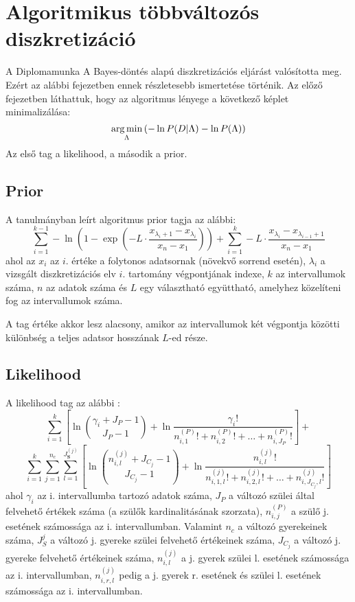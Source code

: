 \chapter{Algoritmikus többváltozós diszkretizáció}
\label{chapter:bayesdontesalapu}
A Diplomamunka A Bayes-döntés alapú diszkretizációs eljárást valósította meg. Ezért az alábbi fejezetben ennek részletesebb ismertetése történik. Az előző fejezetben láthattuk, hogy az algoritmus lényege a következő képlet minimalizálása:
$$ \mathop{\mathrm{arg\,min}}_{\Lambda}{(-\ln{P(D | \Lambda)} - \ln{P(\Lambda)})}$$
Az első tag a likelihood, a második a prior.

\section{Prior}
A tanulmányban \cite{chen2017learning} leírt algoritmus prior tagja az alábbi:
$$\sum_{i=1}^{k-1} -\ln{(1-\exp{(
-L \cdot \frac{x_{\lambda_i+1}-x_{\lambda_i}}{x_{n}-x_{1}})})} +
\sum_{i=1}^{k}
-L \cdot \frac{x_{\lambda_i}-x_{\lambda_{i-1}+1}}{x_{n}-x_{1}}$$
ahol az $x_i$ az $i$. értéke a folytonos adatsornak (növekvő sorrend esetén), $\lambda_i$ a vizsgált diszkretizációs elv $i$. tartomány végpontjának indexe, $k$ az intervallumok száma, $n$ az adatok száma és $L$ egy választható együttható, amelyhez közelíteni fog az intervallumok száma.

A tag értéke akkor lesz alacsony, amikor az intervallumok két végpontja közötti különbség a teljes adatsor hosszának $L$-ed része.

\section{Likelihood}
A likelihood tag az alábbi \cite{boulle2006modl}:
$$
\sum_{i = 1}^{k} \left[ \ln \binom{\gamma_i+J_P-1}{J_P-1} + \ln \frac{\gamma_i!}{n_{i,1}^{(P)}! + n_{i,2}^{(P)}! + \dotsc + n_{i,J_P}^{(P)}!}\right] +
$$
$$
\sum_{i = 1}^{k}\sum_{j=1}^{n_c} \sum_{l=1}^{J_\textbf{S}^{(j)}} \left[ \ln \binom{n_{i,l}^{(j)}+J_{C_j}-1}{J_{C_j}-1} + \ln \frac{n_{i,l}^{(j)}!} {n_{i,1,l}^{(j)}! + n_{i,2,l}^{(j)}! + \dotsc + n_{i,J_{C_j},l}^{(j)}!}  \right]
$$
ahol $\gamma_i$ az i. intervallumba tartozó adatok száma, $J_P$ a változó szülei által felvehető értékek száma (a szülők kardinalitásának szorzata), $n_{i,j}^{(P)}$ a szülő j. esetének számossága az i. intervallumban.
Valamint $n_c$ a változó gyerekeinek száma, $J_S^{j}$ a változó j. gyereke szülei felvehető értékeinek száma, $J_{C_j}$ a változó j. gyereke felvehető értékeinek száma, $n_{i,l}^{(j)}$ a j. gyerek szülei l. esetének számossága az i. intervallumban, $n_{i,r,l}^{(j)}$ pedig a j. gyerek r. esetének és szülei l. esetének számossága az i. intervallumban.

